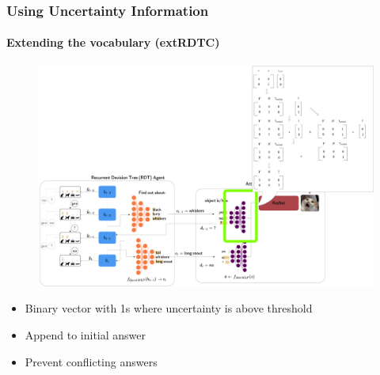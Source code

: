 \documentclass[9pt]{beamer}
\begin{document}
\begin{frame}
\frametitle{Using Uncertainty Information}
\framesubtitle{Extending the vocabulary (extRDTC)}
\begin{figure}
	\includegraphics[width=0.8\linewidth]{images/extRDTC_intution.pdf}
\end{figure}
\begin{itemize}
	\item Binary vector with 1s where uncertainty is above threshold
	\item Append to  initial answer%
	\item Prevent conflicting answers
\end{itemize}
\end{frame}



\end{document}
